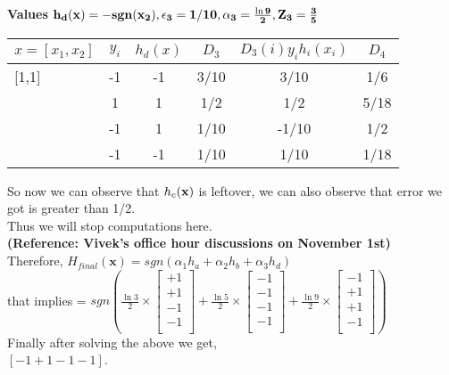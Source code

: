 \documentclass[11pt]{article}
\begin{document}
{\bf Values $\bf h_d({\bf x}) = -sgn(x_2), \epsilon_3 = 1/10, \alpha_3 = \frac{\ln9}{2}, Z_3 = \frac{3}{5}$}
\bgroup 
\def\arraystretch{1.8}
\begin{tabular}{|l|c|c|c|c|c|} \hline 
{\bf \underline {$x=[x_{1},x_{2}]$}} & {\bf \underline {$y_i$}} & {\bf \underline {$ h_{d}(x)$}} & {\bf \underline {$D_3$}} & {\bf \underline {$D_{3}(i)y_{i}h_{i}(x_{i})$}} & {\bf \underline {$D_{4}$}}\\ \hline

  [1,1]          &     -1  & -1    & 3/10   & 3/10                          &  1/6     \\ \hline
    [1,-1]         &    1   & 1    & 1/2   & 1/2                           &    5/18   \\ \hline
    [-1,-1]        &     -1  & 1    & 1/10   & -1/10                           &   1/2    \\ \hline
    [-1,1]         &     -1 & -1    & 1/10   & 1/10                           &   1/18    \\ \hline
\end{tabular}
\egroup

So now we can observe that $h_c({\bf x})$ is leftover, we can also observe that error we got is greater than 1/2.\\
Thus we will stop computations here.\\ {\bf (Reference: Vivek's office hour discussions on November 1st)}\\
Therefore, 
$H_{final}(\textbf{x}) = sgn(\alpha_{1}h_{a} + \alpha_{2}h_{b} + \alpha_{3}h_{d})$ \\

that implies = $sgn(\frac{\ln3}{2} \times \begin{bmatrix}
    +1 \\
+1\\
-1\\
-1\\
    \end{bmatrix}+ \frac{\ln5}{2} \times \begin{bmatrix}
    -1 \\
-1\\
-1\\
-1\\
    \end{bmatrix} + \frac{\ln9}{2} \times \begin{bmatrix}
    -1 \\
+1\\
+1\\
-1\\
    \end{bmatrix})$
\\ Finally after solving the above we get,\\
$ [-1 +1 -1 -1]$.
\end{document}
